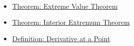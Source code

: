 \begin{remark*}[Dependencies]~\\
\begin{itemize}
  \item \hyperref[thm:extreme-value-theorem]{Theorem: Extreme Value Theorem}
  \item \hyperref[thm:interior-extremum-theorem]{Theorem: Interior Extremum Theorem}
  \item \hyperref[def:derivative-at-a-point]{Definition: Derivative at a Point}
\end{itemize}
\end{remark*}
